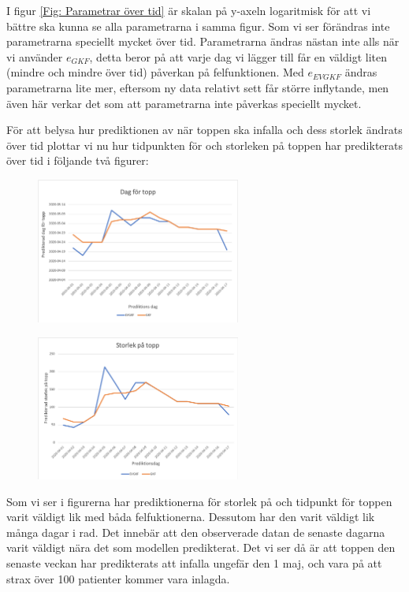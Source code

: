 \documentclass[a4paper, 12pt]{article}
\theoremstyle{definition}
\begin{document}
I figur \ref{Fig: Parametrar över tid} är skalan på y-axeln logaritmisk för att vi bättre ska kunna se alla parametrarna i samma figur. Som vi ser förändras inte parametrarna speciellt mycket över tid. Parametrarna ändras nästan inte alls när vi använder $e_{GKF}$, detta beror på att varje dag vi lägger till får en väldigt liten (mindre och mindre över tid) påverkan på felfunktionen. Med $e_{EVGKF}$ ändras parametrarna lite mer, eftersom ny data relativt sett får större inflytande, men även här verkar det som att parametrarna inte påverkas speciellt mycket.

För att belysa hur prediktionen av när toppen ska infalla och dess storlek ändrats över tid plottar vi nu hur tidpunkten för och storleken på toppen har predikterats över tid i följande två figurer:
\begin{figure}[H]
\centering
\includegraphics[width=0.6\textwidth]{bilder/predikterad_dag_for_topp_over_tid.png}
\caption{}
\end{figure}
\begin{figure}[H]
\centering
\includegraphics[width=0.6\textwidth]{bilder/predikterad_storlek_pa_topp_over_tid.png}
\caption{}
\end{figure}
Som vi ser i figurerna har prediktionerna för storlek på och tidpunkt för toppen varit väldigt lik med båda felfuktionerna. Dessutom har den varit väldigt lik många dagar i rad. Det innebär att den observerade datan de senaste dagarna varit väldigt nära det som modellen predikterat. Det vi ser då är att toppen den senaste veckan har predikterats att infalla ungefär den 1 maj, och vara på att strax över 100 patienter kommer vara inlagda.
\end{document}
